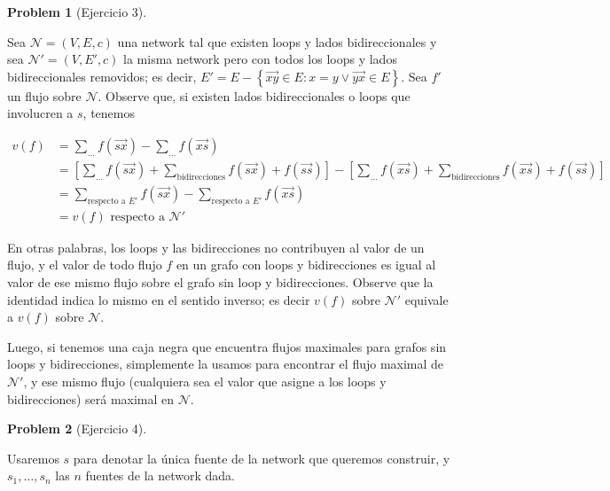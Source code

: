 \documentclass[a4paper]{article}
\newtheorem{problem}{Problem}
\newtheorem{problem}{Problem}
\begin{document}
\begin{problem}[Ejercicio 3]

    
\end{problem}

    Sea $\mathcal{N} = (V, E, c)$ una network tal que existen loops y lados
    bidireccionales y sea $\mathcal{N}' = (V, E', c)$ la misma network pero con todos los
    loops y lados bidireccionales removidos; es decir, $E' = E - \left\{
    \overrightarrow{xy} \in E : x = y \lor \overrightarrow{yx} \in E \right\} $.
    Sea $f'$ un flujo sobre $\mathcal{N}$. Observe que, si existen lados
    bidireccionales o loops que involucren a $s$, tenemos 

    \begin{align*}
        v(f) &= \sum_{\ldots} f(\overrightarrow{sx}) -
        \sum_{\ldots}f(\overrightarrow{xs}) \\ 
             &= \left[ \sum_{\ldots} f(\overrightarrow{sx}) +
                 \sum_{\text{bidirecciones}} f(\overrightarrow{sx}) +
                 f(\overrightarrow{ss}) \right] - \left[  \sum_{\ldots}
             f(\overrightarrow{xs}) + \sum_{\text{bidirecciones}} f(\overrightarrow{xs})+  f(\overrightarrow{ss}) \right] \\ 
             &= \sum_{\text{respecto a } E'} f(\overrightarrow{sx}) -
             \sum_{\text{respecto a } E'}f(\overrightarrow{xs}) \\ 
             &=v(f) \text{ respecto a  } \mathcal{N}'
    \end{align*}

En otras palabras, los loops y las bidirecciones no contribuyen al valor de un
flujo, y el valor de todo flujo $f$ en un grafo con loops y bidirecciones es
igual al valor de ese mismo flujo sobre el grafo sin loop y bidirecciones.
Observe que la identidad indica lo mismo en el sentido inverso; es decir $v(f)$
sobre $\mathcal{N}'$ equivale a $v(f)$ sobre $\mathcal{N}$.

Luego, si tenemos una caja negra que encuentra flujos maximales para grafos sin
loops y bidirecciones, simplemente la usamos para encontrar el flujo maximal de
$\mathcal{N}'$, y ese mismo flujo (cualquiera sea el valor que asigne a los
loops y bidirecciones) será maximal en $\mathcal{N}$.

\begin{problem}[Ejercicio 4]
    
\end{problem}

Usaremos $s$ para denotar la única fuente de la network que queremos construir,
y $s_1, \ldots, s_n$ las $n$ fuentes de la network dada. 
\end{document}
